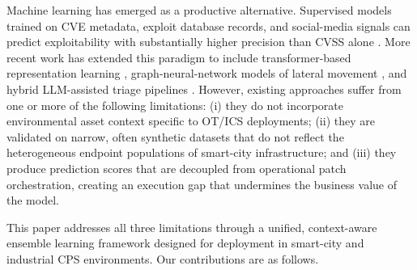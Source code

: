 \documentclass[review,12pt]{elsarticle}
\begin{document}
Machine learning has emerged as a productive alternative. Supervised models trained on CVE metadata, exploit database records, and social-media signals can predict exploitability with substantially higher precision than CVSS alone \citep{sabottke2015,krause2022,vulnpredict,cvebert}. More recent work has extended this paradigm to include transformer-based representation learning \citep{cvebert}, graph-neural-network models of lateral movement \citep{ramirez2024}, and hybrid LLM-assisted triage pipelines \citep{wang2025}. However, existing approaches suffer from one or more of the following limitations: (i) they do not incorporate environmental asset context specific to OT/ICS deployments; (ii) they are validated on narrow, often synthetic datasets that do not reflect the heterogeneous endpoint populations of smart-city infrastructure; and (iii) they produce prediction scores that are decoupled from operational patch orchestration, creating an execution gap that undermines the business value of the model.

This paper addresses all three limitations through a unified, context-aware ensemble learning framework designed for deployment in smart-city and industrial CPS environments. Our contributions are as follows.
\end{document}

